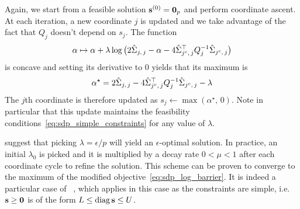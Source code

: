 \bigbreak
Again, we start from a feasible solution $\mathbf{s}^{(0)} = \mathbf{0}_p$ and perform coordinate ascent.
At each iteration, a new coordinate $j$ is updated
and we take advantage of the fact that $Q_j$ doesn't depend on $s_j$.
The function
\begin{equation*}
    \alpha \mapsto \alpha
        + \lambda\log\big( 2\hat{\Sigma}_{j,\, j} - \alpha - 4\hat{\Sigma}_{j^c,\, j}^\top Q_j^{-1} \hat{\Sigma}_{j^c,\, j} \big)
\end{equation*}
is concave and setting its derivative to $0$ yields that its maximum is
\begin{equation*}
    \alpha^\star = 2\hat{\Sigma}_{j,\, j} - 4\hat{\Sigma}_{j^c,\, j}^\top Q_j^{-1} \hat{\Sigma}_{j^c,\, j} - \lambda
\end{equation*}
The $j$th coordinate is therefore updated as $s_j \leftarrow \max\left( \alpha^\star,\, 0 \right)$.
Note in particular that this update maintains the feasibility
conditions~\ref{eq:sdp_simple_constraints} for any value of $\lambda$.

\citet[§11.3]{convex_optimization} suggest that picking $\lambda = \epsilon / p$ will yield an
$\epsilon$-optimal solution.
In practice, an initial $\lambda_0$ is picked and it is multiplied by a decay rate
$0 < \mu < 1$ after each coordinate cycle to refine the solution.
This scheme can be proven to converge to the maximum
of the modified objective~\ref{eq:sdp_log_barrier}.
It is indeed a particular case of ~\citet[Theorem~3]{block_coordinate_sdp},
which applies in this case as the constraints are simple,
i.e. $\mathbf{s} \geq \mathbf{0}$ is of the form $L \leq \operatorname*{diag}\mathbf{s} \leq U$.

